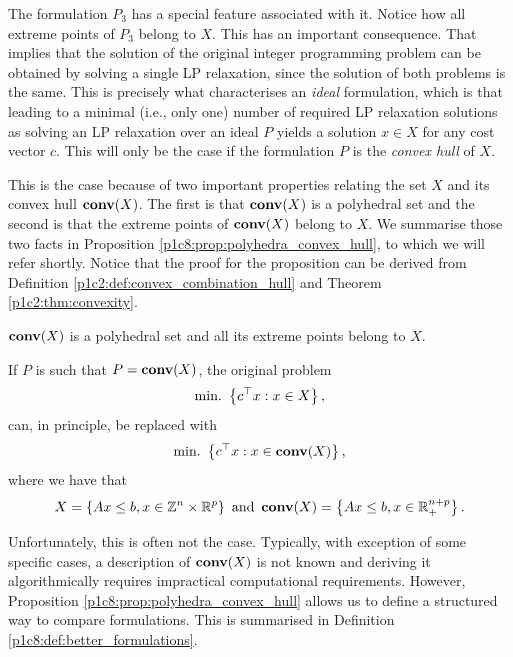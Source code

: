 The formulation $P_3$ has a special feature associated with it. Notice how all extreme points of $P_3$ belong to $X$. This has an important consequence. That implies that the solution of the original integer programming problem can be obtained by solving a single LP relaxation, since the solution of both problems is the same. This is precisely what characterises an \emph{ideal} formulation, which is that leading to a minimal (i.e., only one) number of required LP relaxation solutions as solving an LP relaxation over an ideal $P$ yields a solution $x \in X$ for any cost vector $c$. This will only be the case if the formulation $P$ is the \emph{convex hull} of $X$.

This is the case because of two important properties relating the set $X$ and its convex hull $\mathop{\bf conv}(X)$. The first is that $\mathop{\bf conv}(X)$ is a polyhedral set and the second is that the extreme points of $\mathop{\bf conv}(X)$ belong to $X$. We summarise those two facts in Proposition \ref{p1c8:prop:polyhedra_convex_hull}, to which we will refer shortly. Notice that the proof for the proposition can be derived from Definition \ref{p1c2:def:convex_combination_hull} and Theorem \ref{p1c2:thm:convexity}.
  
\begin{proposition}\label{p1c8:prop:polyhedra_convex_hull}
	$\mathop{\bf conv}(X)$ is a polyhedral set and all its extreme points belong to $X$. 
\end{proposition}

 
If $P$ is such that $P = \mathop{\bf conv} (X)$, the original problem 
%
\begin{equation*}
	\mathop{\text{min.~}}\left\{ c^\top x : x \in X \right \},
\end{equation*}
%
can, in principle, be replaced with 
%
\begin{equation*}
	\mathop{\text{min.~}}\left\{  c^\top x : x \in \mathop{\bf conv}(X) \right \},	
\end{equation*}
%
where we have that 
%
\begin{equation*}
	X = \left\{ Ax \leq b, x \in \mathbb{Z}^n \times \mathbb{R}^p \right \} \text{ and } \mathop{\bf conv}(X) = \left\{ Ax \leq b, x \in \mathbb{R}_+^{n+p} \right \}.	
\end{equation*}

Unfortunately, this is often not the case. Typically, with exception of some specific cases, a description of $\mathop{\bf conv}(X)$ is not known and deriving it algorithmically requires impractical computational requirements. However, Proposition \ref{p1c8:prop:polyhedra_convex_hull} allows us to define a structured way to compare formulations. This is summarised in Definition \ref{p1c8:def:better_formulations}.

